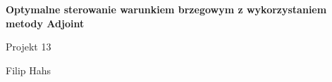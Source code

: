 \documentclass{article}
\begin{document}
	
	\begin{titlepage}
		
		
		
		\vspace{5cm}
		
		\begin{center}
			\vspace*{1cm}
			
			{\Huge \textbf{Optymalne sterowanie warunkiem brzegowym z wykorzystaniem metody Adjoint}}
			
			\vspace{0.5cm}
			{\huge Projekt 13}
			
			\vspace{1.5cm}
			\large{Filip Hahs}
			
			
		\end{center}
		\vfill
		
		
	\end{titlepage}
\end{document}
